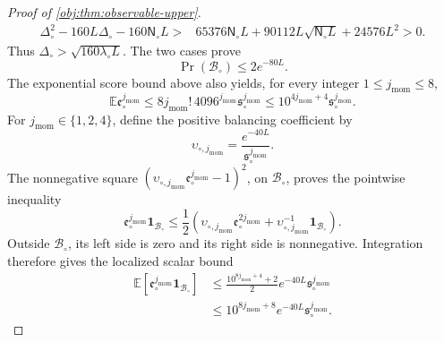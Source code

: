 \documentclass[11pt]{article}
\begin{document}
\begin{proof}[Proof of \cref{obj:thm:observable-upper}]
\[
\begin{aligned}
\Delta_\circ^2-160L\Delta_\circ-160\mathsf N_\circ L
>{}&65376\mathsf N_\circ L
+90112L\sqrt{\mathsf N_\circ L}+24576L^2>0.
\end{aligned}
\]
Thus \(\Delta_\circ>\sqrt{160\lambda_\circ L}\). The two cases prove
\[
\Pr(\mathcal B_\circ)\le2e^{-80L}.
\]
The exponential score bound above also yields, for every integer \(1\le j_{\mathrm{mom}}\le8\),
\[
\mathbb E\mathfrak e_\circ^{j_{\mathrm{mom}}}
\le8j_{\mathrm{mom}}!\,4096^{j_{\mathrm{mom}}}
\mathfrak s_\circ^{j_{\mathrm{mom}}}
\le10^{4j_{\mathrm{mom}}+4}\mathfrak s_\circ^{j_{\mathrm{mom}}}.
\]
For \(j_{\mathrm{mom}}\in\{1,2,4\}\), define the positive balancing coefficient by
\[
\upsilon_{\circ,j_{\mathrm{mom}}}
=\frac{e^{-40L}}{\mathfrak s_\circ^{j_{\mathrm{mom}}}}.
\]
The nonnegative square
\((\upsilon_{\circ,j_{\mathrm{mom}}}\mathfrak e_\circ^{j_{\mathrm{mom}}}-1)^2\), on \(\mathcal B_\circ\), proves the pointwise inequality
\[
\mathfrak e_\circ^{j_{\mathrm{mom}}}\mathbf1_{\mathcal B_\circ}
\le\frac12\left(
\upsilon_{\circ,j_{\mathrm{mom}}}\mathfrak e_\circ^{2j_{\mathrm{mom}}}
+\upsilon_{\circ,j_{\mathrm{mom}}}^{-1}\mathbf1_{\mathcal B_\circ}
\right).
\]
Outside \(\mathcal B_\circ\), its left side is zero and its right side is nonnegative. Integration therefore gives the localized scalar bound
\[
\begin{aligned}
\mathbb E\!\left[
\mathfrak e_\circ^{j_{\mathrm{mom}}}\mathbf1_{\mathcal B_\circ}
\right]
&\le\frac{10^{8j_{\mathrm{mom}}+4}+2}{2}
 e^{-40L}\mathfrak s_\circ^{j_{\mathrm{mom}}}\\
&\le10^{8j_{\mathrm{mom}}+8}
 e^{-40L}\mathfrak s_\circ^{j_{\mathrm{mom}}}.
\end{aligned}
\]


\end{proof}
\end{document}
